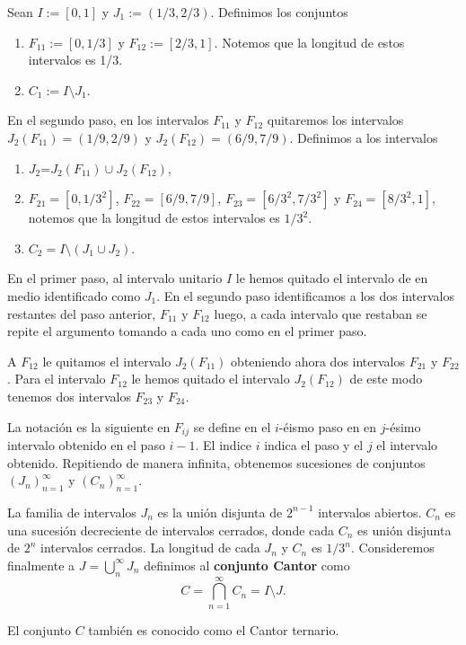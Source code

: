 Sean $I:=[0,1]$ y $J_1:=(1/3,2/3)$. Definimos los conjuntos
\begin{enumerate}
\item $F_{11} := [0,1/3]$ y $F_{12} := [2/3,1]$. Notemos que la longitud de estos intervalos es 1/3.
\item $C_1 := I \setminus J_1$. 
\end{enumerate} 

En el segundo paso, en los intervalos $F_{11}$ y $F_{12}$ quitaremos los intervalos $J_2(F_{11})=(1/9,2/9)$ y $J_2(F_{12})=(6/9,7/9)$. 
Definimos a los intervalos
\begin{enumerate}
\item $J_2$=$J_2(F_{11}) \cup J_2(F_{12})$,
\item $F_{21}=[0,1/3^2]$,  $F_{22}=[6/9,7/9]$, $F_{23}=[6/3^2,7/3^2]$ y $F_{24}=[8/3^2,1]$, notemos que la longitud de estos intervalos es $1/3^2$.
\item $C_2=I \setminus (J_1 \cup J_2)$. 
\end{enumerate} 


En el primer paso, al intervalo unitario $I$ le hemos quitado el intervalo de en medio identificado  como $J_1$. En el segundo paso identificamos a los dos intervalos restantes del paso anterior, $F_{11}$ y $F_{12}$ luego, a cada intervalo que restaban se repite el argumento tomando a cada uno como en el primer paso. 

A $F_{12}$ le quitamos el intervalo $J_2(F_{11})$ obteniendo ahora dos intervalos $F_{21}$ y $F_{22}$. Para el intervalo $F_{12}$ le hemos quitado el intervalo $J_2(F_{12})$ de este modo tenemos dos intervalos $F_{23}$ y $F_{24}$.


La notación es la siguiente en $F_{ij}$ se define en el $i$-éismo paso en en $j$-ésimo intervalo obtenido en el paso $i-1$. El indice $i$ indica el paso y el $j$ el intervalo obtenido. Repitiendo de manera infinita, obtenemos sucesiones de conjuntos $(J_n)_{n=1}^\infty$ y $(C_n)_{n=1}^\infty$.

La familia de intervalos $J_n$ es la unión disjunta de  $2^{n-1}$ intervalos abiertos. $C_n$ es una sucesión decreciente de intervalos cerrados, donde cada $C_n$ es unión disjunta de $2^n$ intervalos cerrados. La longitud de cada $J_n$ y $C_n$ es $1/3^n.$ Consideremos finalmente a $J=\bigcup_{n }^{\infty}  J_n$ definimos al \textbf{conjunto Cantor} como $$C=\bigcap_{n=1}^\infty C_n=I \setminus J.$$ 

El conjunto $C$ también es conocido como el Cantor ternario.


